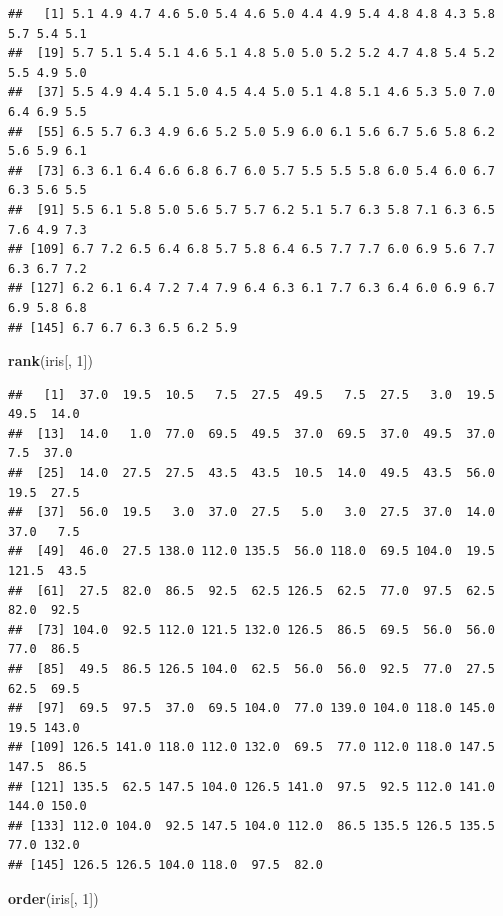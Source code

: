 \documentclass[
]{book}
\newenvironment{Shaded}{\begin{snugshade}}{\end{snugshade}}
\newcommand{\DecValTok}[1]{\textcolor[rgb]{0.00,0.00,0.81}{#1}}
\newcommand{\KeywordTok}[1]{\textcolor[rgb]{0.13,0.29,0.53}{\textbf{#1}}}
\newcommand{\NormalTok}[1]{#1}
\begin{document}
\begin{verbatim}
##   [1] 5.1 4.9 4.7 4.6 5.0 5.4 4.6 5.0 4.4 4.9 5.4 4.8 4.8 4.3 5.8 5.7 5.4 5.1
##  [19] 5.7 5.1 5.4 5.1 4.6 5.1 4.8 5.0 5.0 5.2 5.2 4.7 4.8 5.4 5.2 5.5 4.9 5.0
##  [37] 5.5 4.9 4.4 5.1 5.0 4.5 4.4 5.0 5.1 4.8 5.1 4.6 5.3 5.0 7.0 6.4 6.9 5.5
##  [55] 6.5 5.7 6.3 4.9 6.6 5.2 5.0 5.9 6.0 6.1 5.6 6.7 5.6 5.8 6.2 5.6 5.9 6.1
##  [73] 6.3 6.1 6.4 6.6 6.8 6.7 6.0 5.7 5.5 5.5 5.8 6.0 5.4 6.0 6.7 6.3 5.6 5.5
##  [91] 5.5 6.1 5.8 5.0 5.6 5.7 5.7 6.2 5.1 5.7 6.3 5.8 7.1 6.3 6.5 7.6 4.9 7.3
## [109] 6.7 7.2 6.5 6.4 6.8 5.7 5.8 6.4 6.5 7.7 7.7 6.0 6.9 5.6 7.7 6.3 6.7 7.2
## [127] 6.2 6.1 6.4 7.2 7.4 7.9 6.4 6.3 6.1 7.7 6.3 6.4 6.0 6.9 6.7 6.9 5.8 6.8
## [145] 6.7 6.7 6.3 6.5 6.2 5.9
\end{verbatim}

\begin{Shaded}
\begin{Highlighting}[]
\KeywordTok{rank}\NormalTok{(iris[, }\DecValTok{1}\NormalTok{])}
\end{Highlighting}
\end{Shaded}

\begin{verbatim}
##   [1]  37.0  19.5  10.5   7.5  27.5  49.5   7.5  27.5   3.0  19.5  49.5  14.0
##  [13]  14.0   1.0  77.0  69.5  49.5  37.0  69.5  37.0  49.5  37.0   7.5  37.0
##  [25]  14.0  27.5  27.5  43.5  43.5  10.5  14.0  49.5  43.5  56.0  19.5  27.5
##  [37]  56.0  19.5   3.0  37.0  27.5   5.0   3.0  27.5  37.0  14.0  37.0   7.5
##  [49]  46.0  27.5 138.0 112.0 135.5  56.0 118.0  69.5 104.0  19.5 121.5  43.5
##  [61]  27.5  82.0  86.5  92.5  62.5 126.5  62.5  77.0  97.5  62.5  82.0  92.5
##  [73] 104.0  92.5 112.0 121.5 132.0 126.5  86.5  69.5  56.0  56.0  77.0  86.5
##  [85]  49.5  86.5 126.5 104.0  62.5  56.0  56.0  92.5  77.0  27.5  62.5  69.5
##  [97]  69.5  97.5  37.0  69.5 104.0  77.0 139.0 104.0 118.0 145.0  19.5 143.0
## [109] 126.5 141.0 118.0 112.0 132.0  69.5  77.0 112.0 118.0 147.5 147.5  86.5
## [121] 135.5  62.5 147.5 104.0 126.5 141.0  97.5  92.5 112.0 141.0 144.0 150.0
## [133] 112.0 104.0  92.5 147.5 104.0 112.0  86.5 135.5 126.5 135.5  77.0 132.0
## [145] 126.5 126.5 104.0 118.0  97.5  82.0
\end{verbatim}

\begin{Shaded}
\begin{Highlighting}[]
\KeywordTok{order}\NormalTok{(iris[, }\DecValTok{1}\NormalTok{])}
\end{Highlighting}
\end{Shaded}
\end{document}
